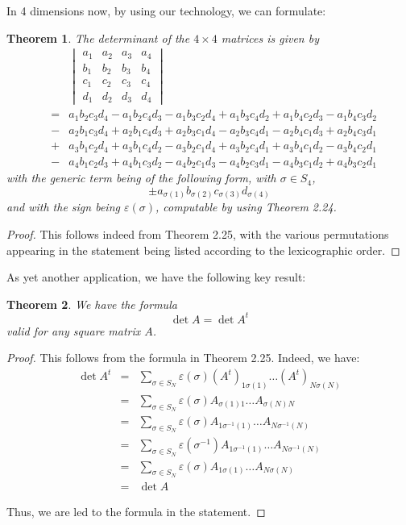 \documentclass[12pt]{amsbook}
\newtheorem{theorem}{Theorem}[chapter]
\begin{document}
In 4 dimensions now, by using our technology, we can formulate:

\begin{theorem}
The determinant of the $4\times4$ matrices is given by
\begin{eqnarray*}
&&\begin{vmatrix}a_1&a_2&a_3&a_4\\ b_1&b_2&b_3&b_4\\ c_1&c_2&c_3&c_4\\ d_1&d_2&d_3&d_4\end{vmatrix}\\
&=&a_1b_2c_3d_4-a_1b_2c_4d_3-a_1b_3c_2d_4+a_1b_3c_4d_2+a_1b_4c_2d_3-a_1b_4c_3d_2\\
&-&a_2b_1c_3d_4+a_2b_1c_4d_3+a_2b_3c_1d_4-a_2b_3c_4d_1-a_2b_4c_1d_3+a_2b_4c_3d_1\\
&+&a_3b_1c_2d_4+a_3b_1c_4d_2-a_3b_2c_1d_4+a_3b_2c_4d_1+a_3b_4c_1d_2-a_3b_4c_2d_1\\
&-&a_4b_1c_2d_3+a_4b_1c_3d_2-a_4b_2c_1d_3-a_4b_2c_3d_1-a_4b_3c_1d_2+a_4b_3c_2d_1
\end{eqnarray*}
with the generic term being of the following form, with $\sigma\in S_4$,
$$\pm a_{\sigma(1)}b_{\sigma(2)}c_{\sigma(3)}d_{\sigma(4)}$$
and with the sign being $\varepsilon(\sigma)$, computable by using Theorem 2.24.
\end{theorem}

\begin{proof}
This follows indeed from Theorem 2.25, with the various permutations appearing in the statement being listed according to the lexicographic order.
\end{proof}

As yet another application, we have the following key result:


\begin{theorem}
We have the formula
$$\det A=\det A^t$$
valid for any square matrix $A$.
\end{theorem}

\begin{proof}
This follows from the formula in Theorem 2.25. Indeed, we have:
\begin{eqnarray*}
\det A^t
&=&\sum_{\sigma\in S_N}\varepsilon(\sigma)(A^t)_{1\sigma(1)}\ldots(A^t)_{N\sigma(N)}\\
&=&\sum_{\sigma\in S_N}\varepsilon(\sigma)A_{\sigma(1)1}\ldots A_{\sigma(N)N}\\
&=&\sum_{\sigma\in S_N}\varepsilon(\sigma)A_{1\sigma^{-1}(1)}\ldots A_{N\sigma^{-1}(N)}\\
&=&\sum_{\sigma\in S_N}\varepsilon(\sigma^{-1})A_{1\sigma^{-1}(1)}\ldots A_{N\sigma^{-1}(N)}\\
&=&\sum_{\sigma\in S_N}\varepsilon(\sigma)A_{1\sigma(1)}\ldots A_{N\sigma(N)}\\
&=&\det A
\end{eqnarray*}

Thus, we are led to the formula in the statement.
\end{proof}
\end{document}
